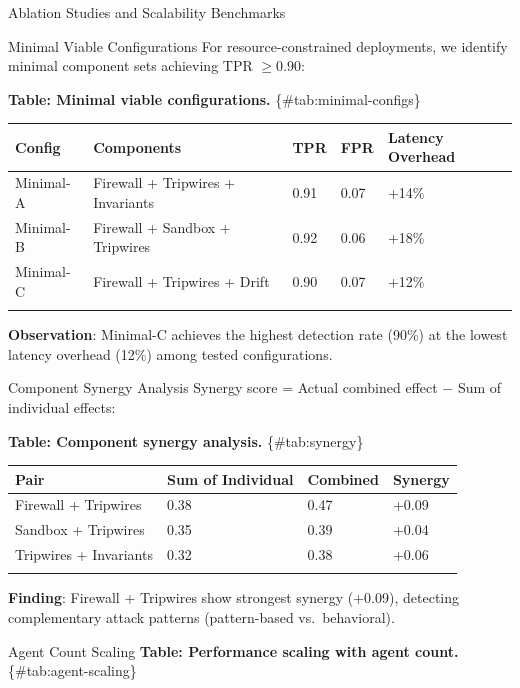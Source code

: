 \documentclass[
  ignorenonframetext,
]{beamer}
\newcounter{none} %
\begin{document}
\begin{frame}[fragile]{Ablation Studies and Scalability Benchmarks}
\begin{block}{Minimal Viable Configurations}
\protect{}\label{sec:minimal-config}
For resource-constrained deployments, we identify minimal component sets
achieving TPR \(\geq 0.90\):

\textbf{Table: Minimal viable configurations.} \{\#tab:minimal-configs\}

{\def\LTcaptype{none} %
\begin{longtable}[]{@{}lllll@{}}
\toprule\noalign{}
Config & Components & TPR & FPR & Latency Overhead \\
\midrule\noalign{}
\endhead
Minimal-A & Firewall + Tripwires + Invariants & 0.91 & 0.07 & +14\% \\
Minimal-B & Firewall + Sandbox + Tripwires & 0.92 & 0.06 & +18\% \\
Minimal-C & Firewall + Tripwires + Drift & 0.90 & 0.07 & +12\% \\
\bottomrule\noalign{}
\end{longtable}
}

\textbf{Observation}: Minimal-C achieves the highest detection rate
(90\%) at the lowest latency overhead (12\%) among tested
configurations.
\end{block}

\begin{block}{Component Synergy Analysis}
\protect{}\label{sec:synergy}
Synergy score = Actual combined effect \(-\) Sum of individual effects:

\textbf{Table: Component synergy analysis.} \{\#tab:synergy\}

{\def\LTcaptype{none} %
\begin{longtable}[]{@{}llll@{}}
\toprule\noalign{}
Pair & Sum of Individual & Combined & Synergy \\
\midrule\noalign{}
\endhead
Firewall + Tripwires & 0.38 & 0.47 & +0.09 \\
Sandbox + Tripwires & 0.35 & 0.39 & +0.04 \\
Tripwires + Invariants & 0.32 & 0.38 & +0.06 \\
\bottomrule\noalign{}
\end{longtable}
}

\textbf{Finding}: Firewall + Tripwires show strongest synergy (+0.09),
detecting complementary attack patterns (pattern-based vs.~behavioral).
\end{block}

\begin{block}{Agent Count Scaling}
\protect{}\label{sec:agent-scaling}
\textbf{Table: Performance scaling with agent count.}
\{\#tab:agent-scaling\}


\end{block}
\end{frame}
\end{document}
